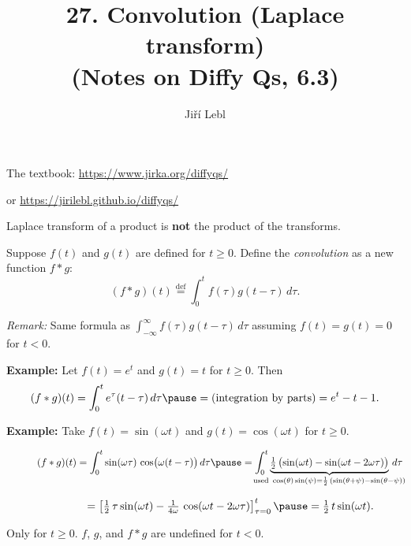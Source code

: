 \documentclass[10pt,aspectratio=169]{beamer}
\author{Ji\v{r}\'i Lebl}
\institute[OSU]{%
Oklahoma State University%
}
\title{27. Convolution (Laplace transform)\\(Notes on Diffy Qs, 6.3)}
\date{}
\begin{document}
\begin{frame}
\titlepage


\begin{center}
The textbook: \url{https://www.jirka.org/diffyqs/}

or \url{https://jirilebl.github.io/diffyqs/}
\end{center}
\end{frame}

\begin{frame}
Laplace transform of a product is \textbf{not} the product of the transforms.

\medskip
\pause

Suppose $f(t)$ and $g(t)$ are defined for $t \geq 0$.  Define
the \emph{convolution} as a new function $f * g$:
\[
(f * g)(t) \overset{\text{def}}{=}
\int_0^t f(\tau) g(t-\tau) \, d\tau .
\]

\pause

\emph{Remark:}  Same formula as
$\int_{-\infty}^\infty f(\tau) g(t-\tau) \, d\tau$
assuming $f(t)=g(t)=0$ for $t < 0$.

\medskip
\pause

\textbf{Example:}
Let $f(t) = e^t$ and $g(t) = t$ for $t \geq 0$.  Then 
\[
(f*g)(t)
=
\int_0^t e^\tau (t-\tau) \, d\tau
\pause
=
\text{(integration by parts)}
=
e^t - t - 1 .
\]

\pause

\textbf{Example:}
Take $f(t) = \sin (\omega t)$ and $g(t) = \cos (\omega t)$ for $t \geq 0$.

\smallskip

$\displaystyle
\quad\qquad
(f*g)(t)
=
\int_0^t  \sin ( \omega \tau ) \,
\cos \bigl( \omega (t-\tau) \bigr) \, d\tau
\pause
=
\int_0^t
\underbrace{
\tfrac{1}{2} \, \bigl( \sin (\omega t) - \sin (\omega t - 2 \omega \tau
) \bigr)
}_{\mathclap{\text{used } \cos (\theta) \sin (\psi) =
\frac{1}{2} \, \left( \sin (\theta + \psi) - \sin (\theta - \psi) \right)}}
\, d\tau
$

\medskip
\pause

$\displaystyle
\quad\qquad
\phantom{(f*g)(t)}
{} =
\left[ \tfrac{1}{2} \, \tau  \sin (\omega t) - \tfrac{1}{4\omega} \, \cos (\omega t -
2 \omega \tau) \right]_{\tau=0}^t
\pause
= \tfrac{1}{2} \, t \sin (\omega t) .
$

\medskip
\pause

Only for $t \geq 0$. \quad  $f$, $g$, and $f*g$ are undefined for $t < 0$.

\end{frame}
\end{document}
